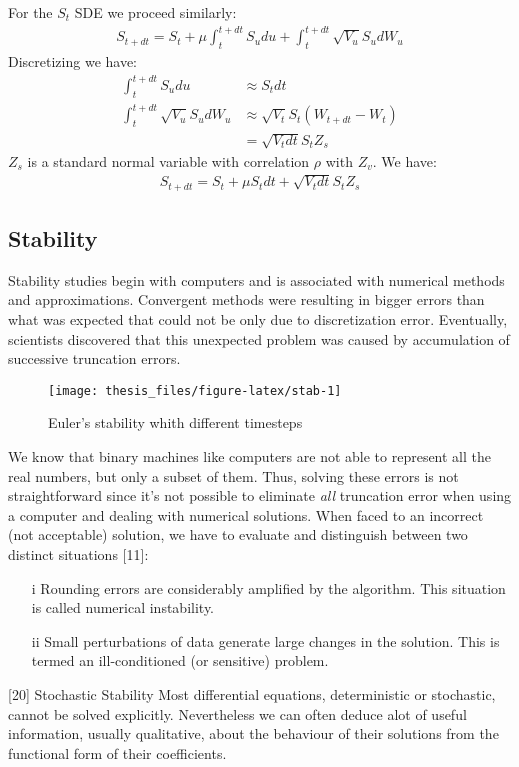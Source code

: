 \documentclass[12pt,twoside]{reedthesis}
\theoremstyle{definition}
\theoremstyle{definition}
\theoremstyle{remark}
\begin{document}
  For the \(S_t\) SDE we proceed similarly:
  \begin{align}
  \label{eq:heseuler}
  S_{t+dt} = S_t+ \mu \int_{t}^{t+dt}{ S_u du} + \int_{t}^{t+dt}{\sqrt{V_u} S_u dW_u}
  \end{align}
  Discretizing we have:
  \begin{align*}
   \int_{t}^{t+dt}{S_u} du &\approx S_t dt\\
   \int_{t}^{t+dt}{\sqrt{V_u} S_u} dW_u &\approx \sqrt{V_t} S_t (W_{t+dt}-W_t)\\
  &= \sqrt{V_t dt} S_t Z_s
  \end{align*}
  \(Z_s\) is a standard normal variable with correlation \(\rho\) with
  \(Z_v\). We have:
  \begin{align}
  S_{t+dt} = S_t + \mu S_t dt + \sqrt{V_t dt} S_t Z_s
  \end{align}
  \subsection{Stability}\label{stability}
  
  Stability studies begin with computers and is associated with numerical
  methods and approximations. Convergent methods were resulting in bigger
  errors than what was expected that could not be only due to
  discretization error. Eventually, scientists discovered that this
  unexpected problem was caused by accumulation of successive truncation
  errors.
  \begin{figure}
  
  {\centering \texttt{[image: thesis\_files/figure-latex/stab-1]} 
  
  }
  
  \caption{Euler's stability whith different timesteps \label{stab}}\label{fig:stab}
  \end{figure}
  We know that binary machines like computers are not able to represent
  all the real numbers, but only a subset of them. Thus, solving these
  errors is not straightforward since it's not possible to eliminate
  \emph{all} truncation error when using a computer and dealing with
  numerical solutions. When faced to an incorrect (not acceptable)
  solution, we have to evaluate and distinguish between two distinct
  situations {[}11{]}:
  \begin{itemize}
    \item [i] Rounding errors are considerably amplified by the algorithm. This situation is called numerical instability.
    \item [ii] Small perturbations of data generate large changes in the solution. This is termed an ill-conditioned (or sensitive) problem.
  \end{itemize}
  {[}20{]} Stochastic Stability Most differential equations, deterministic
  or stochastic, cannot be solved explicitly. Nevertheless we can often
  deduce alot of useful information, usually qualitative, about the
  behaviour of their solutions from the functional form of their
  coefficients.
  
\end{document}
